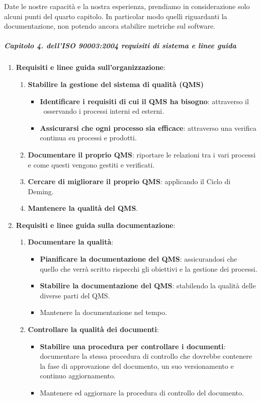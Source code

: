	Date le nostre capacità e la nostra esperienza, prendiamo in considerazione solo alcuni punti del quarto capitolo. In particolar modo quelli riguardanti la documentazione, non potendo ancora stabilire metriche sul software.

	\subparagraph{Capitolo 4. dell'ISO 90003:2004 requisiti di sistema e linee guida}

	\begin{enumerate}
		\item \textbf{Requisiti e linee guida sull'organizzazione}:
		\begin{enumerate}
			\item \textbf{Stabilire la gestione del sistema di qualità (QMS)}
			\begin{itemize}
				\item \textbf{Identificare i requisiti di cui il QMS ha bisogno}: attraverso il \PdQ~osservando i processi interni ed esterni.
				\item \textbf{Assicurarsi che ogni processo sia efficace}: attraverso una verifica continua su processi e prodotti.
			\end{itemize}
			\item \textbf{Documentare il proprio QMS}: riportare le relazioni tra i vari processi e come questi vengono gestiti e verificati.
			\item \textbf{Cercare di migliorare il proprio QMS}: applicando il Ciclo di Deming.
			\item \textbf{Mantenere la qualità del QMS}.
		\end{enumerate}
		\newpage
		\item \textbf{Requisiti e linee guida sulla documentazione}:
		\begin{enumerate}
			\item \textbf{Documentare la qualità}:
			\begin{itemize}
				\item \textbf{Pianificare la documentazione del QMS}: assicurandosi che quello che verrà scritto rispecchi gli obiettivi e la gestione dei processi.
				\item \textbf{Stabilire la documentazione del QMS}: stabilendo la qualità delle diverse parti del QMS.
				\item Mantenere la documentazione nel tempo.
			\end{itemize}

			\item \textbf{Controllare la qualità dei documenti}:
			\begin{itemize}
				\item \textbf{Stabilire una procedura per controllare i documenti}: documentare la stessa procedura di controllo che dovrebbe contenere la fase di approvazione del documento, un suo versionamento e continuo aggiornamento.
				\item Mantenere ed aggiornare la procedura di controllo del documento.
			\end{itemize}
		\end{enumerate}
	\end{enumerate}

